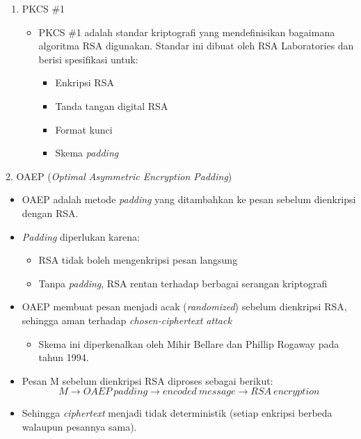 \documentclass{article}
\begin{document}
\begin{enumerate}
    \item PKCS \#1
    \begin{itemize}
        \item PKCS \#1 adalah standar kriptografi yang mendefinisikan bagaimana algoritma RSA digunakan.
        Standar ini dibuat oleh RSA Laboratories dan berisi spesifikasi untuk:
        \begin{itemize}
            \item Enkripsi RSA
            \item Tanda tangan digital RSA
            \item Format kunci
            \item Skema \textit{padding}
        \end{itemize}
    \end{itemize}
\end{enumerate}

\newpage


2. OAEP (\textit{Optimal Asymmetric Encryption Padding})
\begin{itemize}
    \item OAEP adalah metode \textit{padding} yang ditambahkan ke pesan sebelum dienkripsi dengan RSA.
    \item \textit{Padding} diperlukan karena:
    \begin{itemize}
        \item RSA tidak boleh mengenkripsi pesan langsung
        \item Tanpa \textit{padding}, RSA rentan terhadap berbagai serangan kriptografi
    \end{itemize}
    \item OAEP membuat pesan menjadi acak (\textit{randomized}) sebelum dienkripsi RSA, sehingga aman terhadap \textit{chosen-ciphertext attack}
    \begin{itemize}
        \item Skema ini diperkenalkan oleh Mihir Bellare dan Phillip Rogaway pada tahun 1994.
    \end{itemize}
    \item Pesan M sebelum dienkripsi RSA diproses sebagai berikut:
    \[ M \rightarrow OAEP\ padding \rightarrow encoded\ message \rightarrow RSA\ encryption \]
    \item Sehingga \textit{ciphertext} menjadi tidak deterministik (setiap enkripsi berbeda walaupun pesannya sama).
\end{itemize}
\end{document}
